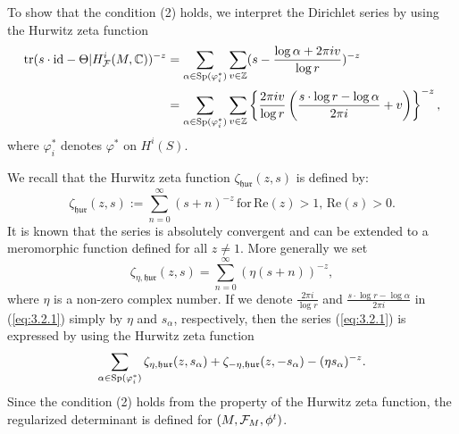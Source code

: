 To show that the condition (2) holds, we interpret the Dirichlet series by using the Hurwitz zeta function 
\begin{equation}\label{eq:3.2.1}
\begin{split}
    {\mathrm{tr}}(s \cdot \mathrm{id} - \Theta | H^{i}_{{\mathcal{F}}}(M,{\mathbb{C}}))^{-z}&=\sum_{\alpha\in{\mathrm{Sp}}(\varphi^{*}_{i})}\sum_{v\in{\mathbb{Z}}}(s-\frac{\log{\alpha}+2\pi{i}{v}}{\log{r}})^{-z}\\
    &=\sum_{\alpha\in{\mathrm{Sp}}(\varphi^{*}_{i})}\sum_{v\in{\mathbb{Z}}} \left\{ \frac{2\pi{i}{v}}{\log{r}}\left(\frac{s\cdot\log{r}-\log \alpha}{2{\pi}{i}}+v\right) \right\}^{-z},
\end{split}
\end{equation}
where $\varphi^{*}_{i}$ denotes $\varphi^{*}$ on $H^{i}(S)$.

We recall that the Hurwitz zeta function $\zeta_{\mathfrak{hur}}(z,s)$ is  defined by:
\begin{equation*}
    \zeta_{\mathfrak{hur}}(z,s):=\sum_{n=0}^{\infty}(s+n)^{-z}\,\mathrm{for}\,\mathrm{Re}(z)>1,\,\mathrm{Re}(s)>0.
\end{equation*}
It is known that the series is absolutely convergent and can be extended to a meromorphic function defined for all $z\ne1$.
More generally we set
\begin{equation*}
    \zeta_{\eta,\mathfrak{hur}}(z,s)=\sum_{n=0}^{\infty}(\eta(s+n))^{-z},
\end{equation*}
where $\eta$ is a non-zero complex number.
If we denote  $\frac{2 \pi i}{\log{r}}$ and $\frac{s\cdot\log{r}-\log \alpha}{2{\pi}{i}}$ in (\ref{eq:3.2.1}) simply by $\eta$ and $s_{\alpha}$, respectively, then the series (\ref{eq:3.2.1}) is expressed by using the Hurwitz zeta function
\begin{equation*}
    \sum_{\alpha\in{\mathrm{Sp}}(\varphi^{*}_{i})}\zeta_{\eta,\mathfrak{hur}}(z,s_{\alpha})+\zeta_{-\eta,\mathfrak{hur}}(z,-s_{\alpha})-(\eta{s_{\alpha}})^{-z}.
\end{equation*}
Since the condition (2) holds from the property of the Hurwitz zeta function, the regularized determinant is defined for $(M,{\mathcal{F}}_{M},\phi^{t})$.


